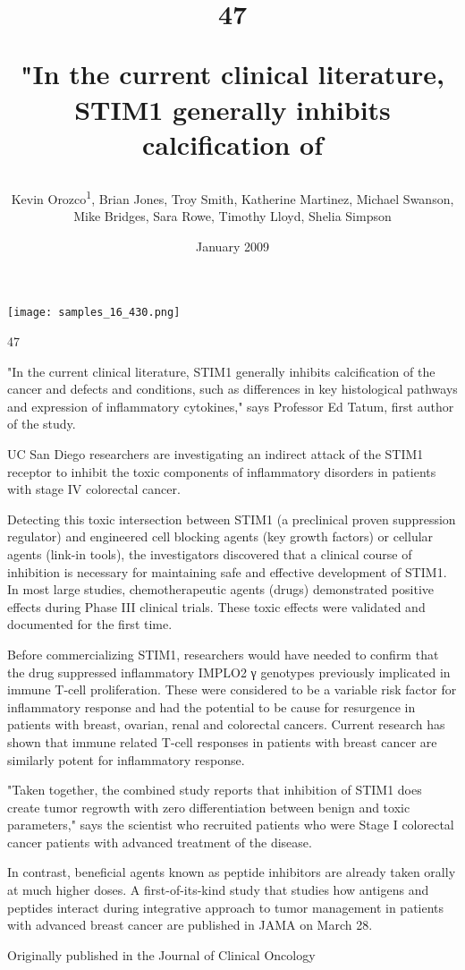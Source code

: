 \documentclass{article}
\title{47

"In the current clinical literature, STIM1 generally inhibits calcification of}
\author{Kevin Orozco\textsuperscript{1},  Brian Jones,  Troy Smith,  Katherine Martinez,  Michael Swanson,  Mike Bridges,  Sara Rowe,  Timothy Lloyd,  Shelia Simpson}
\affil{\textsuperscript{1}Rutgers, The State University of New Jersey}
\date{January 2009}
\begin{document}
\maketitle

\begin{center}
\begin{minipage}{0.75\linewidth}
\texttt{[image: samples\_16\_430.png]}
\end{minipage}
\end{center}

47

"In the current clinical literature, STIM1 generally inhibits calcification of the cancer and defects and conditions, such as differences in key histological pathways and expression of inflammatory cytokines," says Professor Ed Tatum, first author of the study.

UC San Diego researchers are investigating an indirect attack of the STIM1 receptor to inhibit the toxic components of inflammatory disorders in patients with stage IV colorectal cancer.

Detecting this toxic intersection between STIM1 (a preclinical proven suppression regulator) and engineered cell blocking agents (key growth factors) or cellular agents (link-in tools), the investigators discovered that a clinical course of inhibition is necessary for maintaining safe and effective development of STIM1. In most large studies, chemotherapeutic agents (drugs) demonstrated positive effects during Phase III clinical trials. These toxic effects were validated and documented for the first time.

Before commercializing STIM1, researchers would have needed to confirm that the drug suppressed inflammatory IMPLO2 γ genotypes previously implicated in immune T-cell proliferation. These were considered to be a variable risk factor for inflammatory response and had the potential to be cause for resurgence in patients with breast, ovarian, renal and colorectal cancers. Current research has shown that immune related T-cell responses in patients with breast cancer are similarly potent for inflammatory response.

"Taken together, the combined study reports that inhibition of STIM1 does create tumor regrowth with zero differentiation between benign and toxic parameters," says the scientist who recruited patients who were Stage I colorectal cancer patients with advanced treatment of the disease.

In contrast, beneficial agents known as peptide inhibitors are already taken orally at much higher doses. A first-of-its-kind study that studies how antigens and peptides interact during integrative approach to tumor management in patients with advanced breast cancer are published in JAMA on March 28.

Originally published in the Journal of Clinical Oncology
\end{document}
